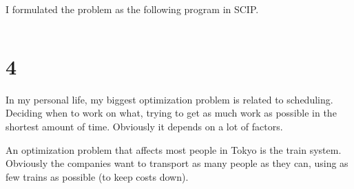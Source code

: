 \documentclass[12pt]{report}
\begin{document}
I formulated the problem as the following program in SCIP.

\begin{verbatim}
\end{verbatim}




\section*{4}
In my personal life, my biggest optimization problem is related to scheduling. Deciding when to work on what, trying to get as much work as possible in the shortest amount of time. Obviously it depends on a lot of factors.

An optimization problem that affects most people in Tokyo is the train system. Obviously the companies want to transport as many people as they can, using as few trains as possible (to keep costs down).
\end{document}
